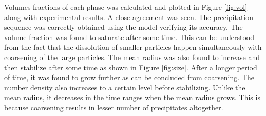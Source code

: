 \documentclass[12pt]{article}
\begin{document}
Volumes fractions of each phase was calculated and plotted in Figure \ref{fig:vol} along with experimental results. A close agreement was seen. The precipitation sequence was correctly obtained using the model verifying its accuracy.
The volume fraction was found to saturate after some time. This can be understood from the fact that the dissolution of smaller particles happen simultaneously with coarsening of the large particles. The mean radius was also found to increase and then stabilize after some time as shown in Figure \ref{fig:size}. After a longer period of time, it was found to grow further as can be concluded from coarsening. The number density also increases to a certain level before stabilizing. Unlike the mean radius, it decreases in the time ranges when the mean radius grows. This is because coarsening results in lesser number of precipitates altogether.
\end{document}

